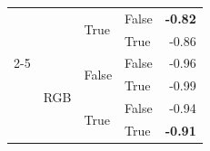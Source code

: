 \begin{tabular}{@{}llllr@{}}
                                                                        &                           & \multirow[c]{2}{*}{True}  & False                     & \textbf{-0.82} \\
                                                                        &                           &                           & True                      & -0.86 \\
    \cmidrule{2-5}                                                      
                                                                        & \multirow[c]{4}{*}{RGB}   & \multirow[c]{2}{*}{False} & False                     & -0.96 \\
                                                                        &                           &                           & True                      & -0.99 \\
                                                                        &                           & \multirow[c]{2}{*}{True}  & False                     & -0.94 \\
                                                                        &                           &                           & True                      & \textbf{-0.91} \\
   \bottomrule
\end{tabular}
